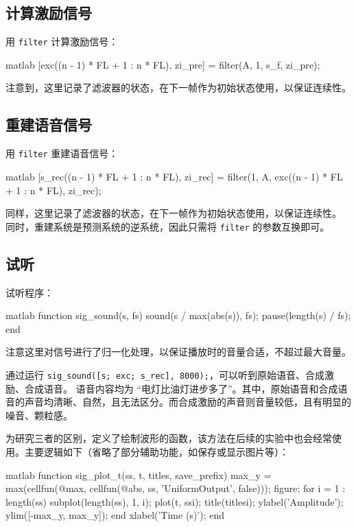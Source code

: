 \documentclass[a4paper]{article}  %
\begin{document}
\subsection{计算激励信号}

用 \texttt{filter} 计算激励信号：
\begin{codeblock}{matlab}
[exc((n - 1) * FL + 1 : n * FL), zi_pre] = filter(A, 1, s_f, zi_pre);
\end{codeblock}

注意到，这里记录了滤波器的状态，在下一帧作为初始状态使用，以保证连续性。

\subsection{重建语音信号}

用 \texttt{filter} 重建语音信号：
\begin{codeblock}{matlab}
[s_rec((n - 1) * FL + 1 : n * FL), zi_rec] = filter(1, A, exc((n - 1) * FL + 1 : n * FL), zi_rec);
\end{codeblock}

同样，这里记录了滤波器的状态，在下一帧作为初始状态使用，以保证连续性。
同时，重建系统是预测系统的逆系统，因此只需将 \texttt{filter} 的参数互换即可。

\subsection{试听}

试听程序：
\begin{codeblock}{matlab}
function sig_sound(s, fs)
    sound(s / max(abs(s)), fs);
    pause(length(s) / fs);
end
\end{codeblock}

注意这里对信号进行了归一化处理，以保证播放时的音量合适，不超过最大音量。

通过运行 \texttt{sig\_sound([s; exc; s\_rec], 8000);}，可以听到原始语音、合成激励、合成语音。
语音内容均为 “电灯比油灯进步多了”。其中，原始语音和合成语音的声音均清晰、自然，且无法区分。而合成激励的声音则音量较低，且有明显的噪音、颗粒感。

为研究三者的区别，定义了绘制波形的函数，该方法在后续的实验中也会经常使用。主要逻辑如下（省略了部分辅助功能，如保存或显示图片等）：
\begin{codeblock}{matlab}
function sig_plot_t(ss, t, titles, save_prefix)
    max_y = max(cellfun(@max, cellfun(@abs, ss, 'UniformOutput', false)));
    figure;
    for i = 1 : length(ss)
        subplot(length(ss), 1, i);
        plot(t, ss{i});
        title(titles{i});
        ylabel('Amplitude');
        ylim([-max_y, max_y]);
    end
    xlabel('Time (s)');
end
\end{codeblock}
\end{document}

